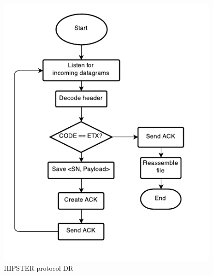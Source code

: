 \documentclass[10pt,twocolumn]{article}
\begin{document}
\begin{figure}[htp]
  \centering
  \includegraphics[width=0.75\columnwidth, keepaspectratio]{Documentation/Receiver.pdf}
  \caption{HIPSTER protocol DR}
  \label{fig:receiverFlowchart}
\end{figure}
\end{document}
